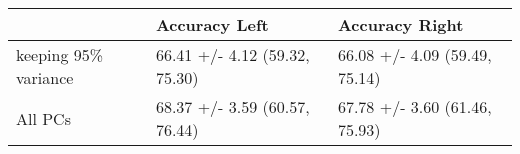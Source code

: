 \begin{tabular}{lll}
\toprule
{} &                  Accuracy Left &                 Accuracy Right \\
\midrule
keeping 95\% variance &  66.41 +/- 4.12 (59.32, 75.30) &  66.08 +/- 4.09 (59.49, 75.14) \\
All PCs              &  68.37 +/- 3.59 (60.57, 76.44) &  67.78 +/- 3.60 (61.46, 75.93) \\
\bottomrule
\end{tabular}
